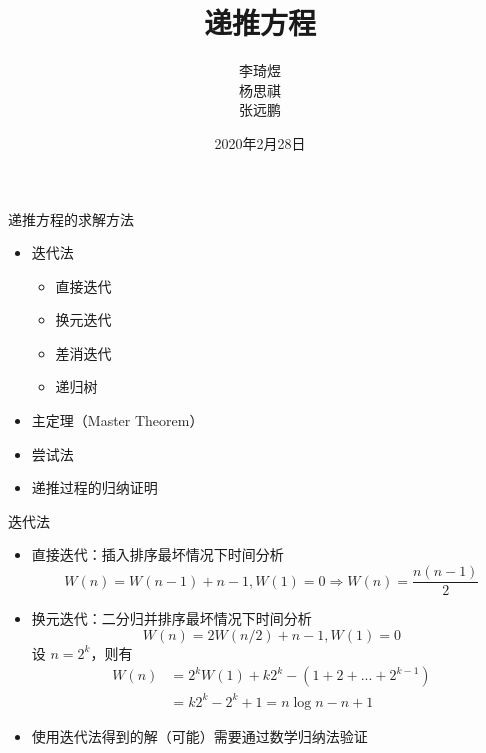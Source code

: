 \documentclass{ctexbeamer}
\title{递推方程}
\author{李琦煜 \\ 杨思祺 \\ 张远鹏}
\institute{算法设计与分析2020小班17}
\date{2020年2月28日}
\begin{document}
    \begin{frame}
        \maketitle
    \end{frame}

    \begin{frame}{递推方程的求解方法}
        \begin{itemize}
            \setlength{\itemsep}{1em}
            \item 迭代法
            \begin{itemize}
                \setlength{\itemsep}{0.3em}
                \item 直接迭代
                \item 换元迭代
                \item 差消迭代
                \item 递归树
            \end{itemize}
            \item 主定理（Master Theorem）
            \item 尝试法
            \item 递推过程的归纳证明
        \end{itemize}
    \end{frame}

    
    \begin{frame}{迭代法}
            \begin{itemize}
                \item<1-> 直接迭代：插入排序最坏情况下时间分析
                $$W(n)=W(n-1)+n-1,W(1)=0\Rightarrow W(n)=\frac{n(n-1)}{2}$$
                \item<2-> 换元迭代：二分归并排序最坏情况下时间分析
                $$W(n)=2W(n/2)+n-1,W(1)=0$$
                设 $n=2^k$，则有
                \begin{align*} W(n) &=
2^kW(1)+k2^k-(1+2+...+2^{k-1})\\&=k2^k-2^k+1=n\log n-n+1\end{align*}
                \item<3->  使用迭代法得到的解（可能）需要通过数学归纳法验证
            \end{itemize}
    \end{frame}
\end{document}
